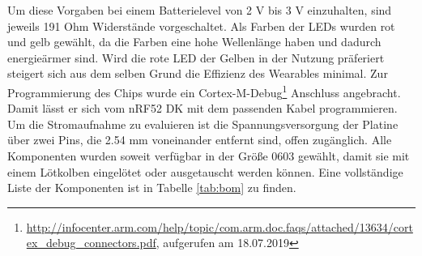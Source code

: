 Um diese Vorgaben bei einem Batterielevel von 2 V bis 3 V einzuhalten, sind jeweils 191 Ohm Widerstände vorgeschaltet.
Als Farben der LEDs wurden rot und gelb gewählt, da die Farben eine hohe Wellenlänge haben und dadurch energieärmer sind.
Wird die rote LED der Gelben in der Nutzung präferiert steigert sich aus dem selben Grund die Effizienz des Wearables minimal.
Zur Programmierung des Chips wurde ein Cortex-M-Debug\footnote{\url{http://infocenter.arm.com/help/topic/com.arm.doc.faqs/attached/13634/cortex_debug_connectors.pdf}, aufgerufen am 18.07.2019} Anschluss angebracht.
Damit lässt er sich vom nRF52 DK mit dem passenden Kabel programmieren.
Um die Stromaufnahme zu evaluieren ist die Spannungsversorgung der Platine über zwei Pins, die 2.54 mm voneinander entfernt sind, offen zugänglich.
Alle Komponenten wurden soweit verfügbar in der Größe 0603 gewählt, damit sie mit einem Lötkolben eingelötet oder ausgetauscht werden können.
Eine vollständige Liste der Komponenten ist in Tabelle \ref{tab:bom} zu finden.\\

